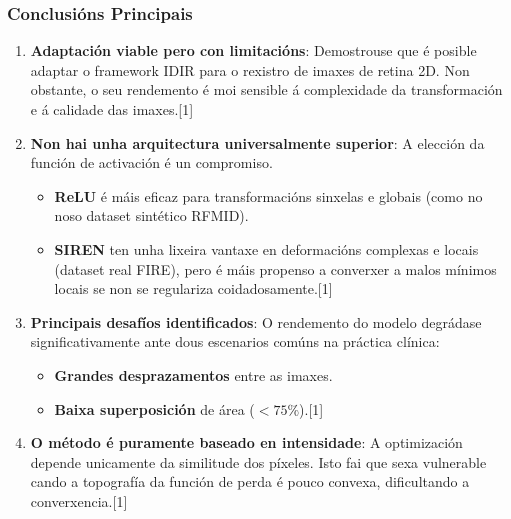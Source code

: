 \documentclass[xcolor=dvipsnames]{beamer}
\begin{document}
\begin{frame}
    \frametitle{Conclusións Principais}
    
    \begin{enumerate}
        \item \textbf{Adaptación viable pero con limitacións}: Demostrouse que é posible adaptar o framework IDIR para o rexistro de imaxes de retina 2D. Non obstante, o seu rendemento é moi sensible á complexidade da transformación e á calidade das imaxes.[1]
        
        \vspace{0.4cm}
        
        \item \textbf{Non hai unha arquitectura universalmente superior}: A elección da función de activación é un compromiso.
        \begin{itemize}
            \item \textbf{ReLU} é máis eficaz para transformacións sinxelas e globais (como no noso dataset sintético RFMID).
            \item \textbf{SIREN} ten unha lixeira vantaxe en deformacións complexas e locais (dataset real FIRE), pero é máis propenso a converxer a malos mínimos locais se non se regulariza coidadosamente.[1]
        \end{itemize}
        
        \vspace{0.4cm}
        
        \item \textbf{Principais desafíos identificados}: O rendemento do modelo degrádase significativamente ante dous escenarios comúns na práctica clínica:
        \begin{itemize}
            \item \textbf{Grandes desprazamentos} entre as imaxes.
            \item \textbf{Baixa superposición} de área ($<75\%$).[1]
        \end{itemize}
        
        \vspace{0.4cm}
        
        \item \textbf{O método é puramente baseado en intensidade}: A optimización depende unicamente da similitude dos píxeles. Isto fai que sexa vulnerable cando a topografía da función de perda é pouco convexa, dificultando a converxencia.[1]
    \end{enumerate}
    

\end{frame}
\end{document}
